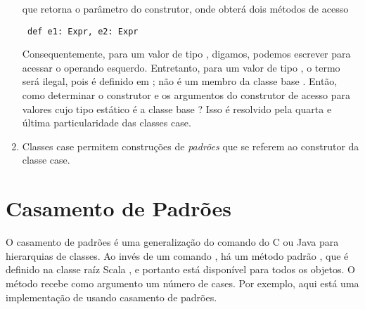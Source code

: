 \begin{enumerate}
que retorna o par\^{a}metro  do construtor, onde  obter\'{a} dois m\'{e}todos de acesso
 \begin{lstlisting}
 def e1: Expr, e2: Expr
 \end{lstlisting}

Consequentemente, para um valor  de tipo , digamos, 
podemos escrever  para acessar o operando esquerdo. Entretanto, 
para um valor  de tipo , o termo  ser\'{a} ilegal,
pois  \'{e} definido em ; n\~{a}o \'{e} um membro da classe base
.
Ent\~{a}o, como determinar o construtor e os argumentos do construtor de acesso
para valores cujo tipo est\'{a}tico \'{e} a classe base ? Isso \'{e} resolvido
pela quarta e \'{u}ltima particularidade das classes case.
\item
Classes case permitem constru\c{c}\~{o}es de {\em padr\~{o}es} que se referem ao construtor 
da classe case.
 \end{enumerate}

\section{Casamento de Padr\~{o}es}

O casamento de padr\~{o}es \'{e} uma generaliza\c{c}\~{a}o do comando  do C ou
Java para hierarquias de classes. Ao inv\'{e}s de um comando , h\'{a} um 
m\'{e}todo padr\~{a}o , que \'{e} definido na classe ra\'{i}z Scala , e 
portanto est\'{a} dispon\'{i}vel para todos os objetos. O m\'{e}todo  recebe como 
argumento um n\'{u}mero de cases. Por exemplo, aqui est\'{a} uma implementa\c{c}\~{a}o de 
usando casamento de padr\~{o}es.

